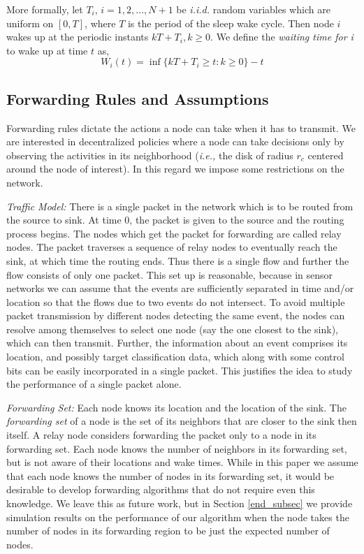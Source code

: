 \documentclass[onecolumn]{IEEEtran}
\begin{document}
More formally, let $T_i$, $i=1,2,...,N+1$ be \emph{i.i.d.} random variables
which are uniform on $[0,T]$, where $T$ is the period of the sleep
wake cycle. Then node $i$ wakes up at the periodic instants $kT+T_i,
k\ge0$.  We define the \emph{waiting time for i} to wake up at time
$t$ as,
\begin{equation}
\label{waiting_eqn}
W_{i}(t)=\inf\{kT+T_i\ge t:k\ge0\}-t
\end{equation} 
\subsection{Forwarding Rules and Assumptions}
Forwarding rules dictate the actions a node can take when it has to
transmit. We are interested in decentralized policies where a node can
take decisions only by observing the activities in its neighborhood
(\emph{i.e.,} the disk of radius $r_c$ centered around the node of
interest). In this regard we impose some restrictions on the network.

\noindent
\emph{Traffic Model:} There is a single packet in the network which is
to be routed from the source to sink.  At time $0$, the packet is
given to the source and the routing process begins. The nodes which
get the packet for forwarding are called relay nodes. The packet
traverses a sequence of relay nodes to eventually reach the sink, at
which time the routing ends.  Thus there is a single flow and further
the flow consists of only one packet. This set up is reasonable,
because in sensor networks we can assume that the events are
sufficiently separated in time and/or location so that the flows due
to two events do not intersect. To avoid multiple packet transmission
by different nodes detecting the same event, the nodes can resolve
among themselves to select one node (say the one closest to the sink),
which can then transmit. Further, the information about an event
comprises its location, and possibly target classification data, which
along with some control bits can be easily incorporated in a single
packet. This justifies the idea to study the performance of a single
packet alone. 

\noindent
\emph{Forwarding Set:} Each node knows its location and the location
of the sink. The \emph{forwarding set} of a node is the set of its
neighbors that are closer to the sink then itself.  A relay node
considers forwarding the packet only to a node in its forwarding set.
Each node knows the number of neighbors in its forwarding set, but is
not aware of their locations and wake times.  While in this paper we
assume that each node knows the number of nodes in its forwarding set,
it would be desirable to develop forwarding algorithms that do not
require even this knowledge. We leave this as future work, but in
Section \ref{end_subsec} we provide simulation results on the
performance of our algorithm when the node takes the number of nodes
in its forwarding region to be just the expected number of nodes.
\end{document}
